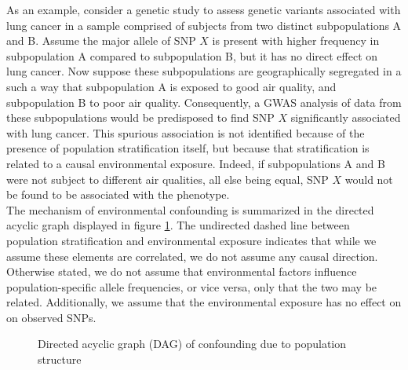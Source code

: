 As an example, consider a genetic study to assess genetic variants associated with lung cancer in a sample comprised of subjects from two distinct subpopulations A and B. Assume the major allele of SNP $X$ is present with higher frequency in subpopulation A compared to subpopulation B, but it has no direct effect on lung cancer. Now suppose these subpopulations are geographically segregated in a such a way that subpopulation A is exposed to good air quality, and subpopulation B to poor air quality. Consequently, a GWAS analysis of data from these subpopulations would be predisposed to find SNP $X$ significantly associated with lung cancer. This spurious association is not identified because of the presence of population stratification itself, but because that stratification is related to a causal environmental exposure. Indeed, if subpopulations A and B were not subject to different air qualities, all else being equal, SNP $X$ would not be found to be associated with the phenotype.\\


The mechanism of environmental confounding is summarized in the directed acyclic graph displayed in figure \ref{fig:ps_env}. The undirected dashed line between population stratification and environmental exposure indicates that while we assume these elements are correlated, we do not assume any causal direction. Otherwise stated, we do not assume that environmental factors influence population-specific allele frequencies, or vice versa, only that the two may be related. Additionally, we assume that the environmental exposure has no  effect on on observed SNPs.   

\begin{figure}[H]
\centering
{}
\caption{Directed acyclic graph (DAG) of confounding due to population structure}
\label{fig:ps_env}
\end{figure}

